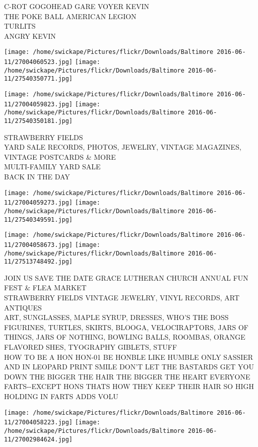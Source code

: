 \documentclass[10pt,letterpaper]{article}
\begin{document}
C{-}ROT GOGOHEAD GARE VOYER KEVIN\\
THE POKE BALL AMERICAN LEGION\\
TURLITS\\
ANGRY KEVIN
\pagebreak

\texttt{[image: /home/swickape/Pictures/flickr/Downloads/Baltimore 2016-06-11/27004060523.jpg]}
\texttt{[image: /home/swickape/Pictures/flickr/Downloads/Baltimore 2016-06-11/27540350771.jpg]}

\texttt{[image: /home/swickape/Pictures/flickr/Downloads/Baltimore 2016-06-11/27004059823.jpg]}
\texttt{[image: /home/swickape/Pictures/flickr/Downloads/Baltimore 2016-06-11/27540350181.jpg]}

STRAWBERRY FIELDS\\
YARD SALE RECORDS, PHOTOS, JEWELRY, VINTAGE MAGAZINES, VINTAGE POSTCARDS \& MORE\\
MULTI{-}FAMILY YARD SALE\\
BACK IN THE DAY
\pagebreak

\texttt{[image: /home/swickape/Pictures/flickr/Downloads/Baltimore 2016-06-11/27004059273.jpg]}
\texttt{[image: /home/swickape/Pictures/flickr/Downloads/Baltimore 2016-06-11/27540349591.jpg]}

\texttt{[image: /home/swickape/Pictures/flickr/Downloads/Baltimore 2016-06-11/27004058673.jpg]}
\texttt{[image: /home/swickape/Pictures/flickr/Downloads/Baltimore 2016-06-11/27513748492.jpg]}

JOIN US SAVE THE DATE GRACE LUTHERAN CHURCH ANNUAL FUN FEST \& FLEA MARKET\\
STRAWBERRY FIELDS VINTAGE JEWELRY, VINYL RECORDS, ART ANTIQUES\\
ART, SUNGLASSES, MAPLE SYRUP, DRESSES, WHO'S THE BOSS FIGURINES, TURTLES, SKIRTS, BLOOGA, VELOCIRAPTORS, JARS OF THINGS, JARS OF NOTHING, BOWLING BALLS, ROOMBAS, ORANGE FLAVORED SHES, TYOGRAPHY GIBLETS, STUFF\\
HOW TO BE A HON HON{-}01 BE HONBLE LIKE HUMBLE ONLY SASSIER AND IN LEOPARD PRINT SMILE DON'T LET THE BASTARDS GET YOU DOWN THE BIGGER THE HAIR THE BIGGER THE HEART EVERYONE FARTS{-}{-}EXCEPT HONS THATS HOW THEY KEEP THEIR HAIR SO HIGH HOLDING IN FARTS ADDS VOLU
\pagebreak

\texttt{[image: /home/swickape/Pictures/flickr/Downloads/Baltimore 2016-06-11/27004058223.jpg]}
\texttt{[image: /home/swickape/Pictures/flickr/Downloads/Baltimore 2016-06-11/27002984624.jpg]}
\end{document}
